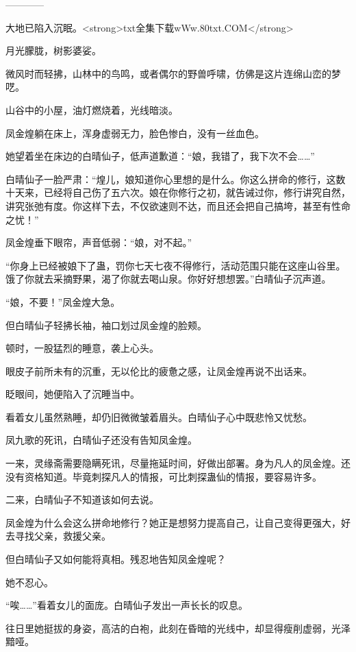 
\begin{this_body}

------------

大地已陷入沉眠。<strong>txt全集下载wWw.80txt.COM</strong>

月光朦胧，树影婆娑。

微风时而轻拂，山林中的鸟鸣，或者偶尔的野兽呼啸，仿佛是这片连绵山峦的梦呓。

山谷中的小屋，油灯燃烧着，光线暗淡。

凤金煌躺在床上，浑身虚弱无力，脸色惨白，没有一丝血色。

她望着坐在床边的白晴仙子，低声道歉道：“娘，我错了，我下次不会……”

白晴仙子一脸严肃：“煌儿，娘知道你心里想的是什么。你这么拼命的修行，这数十天来，已经将自己伤了五六次。娘在你修行之初，就告诫过你，修行讲究自然，讲究张弛有度。你这样下去，不仅欲速则不达，而且还会把自己搞垮，甚至有性命之忧！”

凤金煌垂下眼帘，声音低弱：“娘，对不起。”

“你身上已经被娘下了蛊，罚你七天七夜不得修行，活动范围只能在这座山谷里。饿了你就去采摘野果，渴了你就去喝山泉。你好好想想罢。”白晴仙子沉声道。

“娘，不要！”凤金煌大急。

但白晴仙子轻拂长袖，袖口划过凤金煌的脸颊。

顿时，一股猛烈的睡意，袭上心头。

眼皮子前所未有的沉重，无以伦比的疲惫之感，让凤金煌再说不出话来。

眨眼间，她便陷入了沉睡当中。

看着女儿虽然熟睡，却仍旧微微皱着眉头。白晴仙子心中既悲怜又忧愁。

凤九歌的死讯，白晴仙子还没有告知凤金煌。

一来，灵缘斋需要隐瞒死讯，尽量拖延时间，好做出部署。身为凡人的凤金煌。还没有资格知道。毕竟刺探凡人的情报，可比刺探蛊仙的情报，要容易许多。

二来，白晴仙子不知道该如何去说。

凤金煌为什么会这么拼命地修行？她正是想努力提高自己，让自己变得更强大，好去寻找父亲，救援父亲。

但白晴仙子又如何能将真相。残忍地告知凤金煌呢？

她不忍心。

“唉……”看着女儿的面庞。白晴仙子发出一声长长的叹息。

往日里她挺拔的身姿，高洁的白袍，此刻在昏暗的光线中，却显得瘦削虚弱，光泽黯哑。


\end{this_body}
